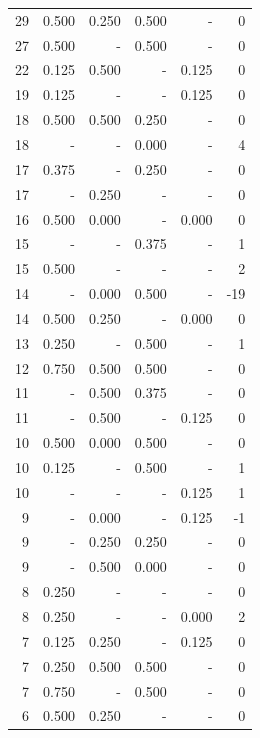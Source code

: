 \documentclass[a4paper]{article}\usepackage[]{graphicx}\usepackage[]{color}
\begin{document}
\begin{table}[ht]
\begin{tabular}{rrrrrr}
   \rowcolor{badColor} 29 & 0.500 & 0.250 & 0.500 & - & 0 \\ 
   \rowcolor{sosoColor} 27 & 0.500 & - & 0.500 & - & 0 \\ 
  22 & 0.125 & 0.500 & - & 0.125 & 0 \\ 
   \rowcolor{nullColor} 19 & 0.125 & - & - & 0.125 & 0 \\ 
   \rowcolor{badColor} 18 & 0.500 & 0.500 & 0.250 & - & 0 \\ 
   \rowcolor{sosoColor} 18 & - & - & 0.000 & - & 4 \\ 
   \rowcolor{sosoColor} 17 & 0.375 & - & 0.250 & - & 0 \\ 
  17 & - & 0.250 & - & - & 0 \\ 
  16 & 0.500 & 0.000 & - & 0.000 & 0 \\ 
   \rowcolor{sosoColor} 15 & - & - & 0.375 & - & 1 \\ 
   \rowcolor{nullColor} 15 & 0.500 & - & - & - & 2 \\ 
   \rowcolor{badColor} 14 & - & 0.000 & 0.500 & - & -19 \\ 
  14 & 0.500 & 0.250 & - & 0.000 & 0 \\ 
   \rowcolor{sosoColor} 13 & 0.250 & - & 0.500 & - & 1 \\ 
   \rowcolor{goodColor} 12 & 0.750 & 0.500 & 0.500 & - & 0 \\ 
  11 & - & 0.500 & 0.375 & - & 0 \\ 
  11 & - & 0.500 & - & 0.125 & 0 \\ 
   \rowcolor{badColor} 10 & 0.500 & 0.000 & 0.500 & - & 0 \\ 
   \rowcolor{sosoColor} 10 & 0.125 & - & 0.500 & - & 1 \\ 
   \rowcolor{nullColor} 10 & - & - & - & 0.125 & 1 \\ 
  9 & - & 0.000 & - & 0.125 & -1 \\ 
   \rowcolor{goodColor} 9 & - & 0.250 & 0.250 & - & 0 \\ 
   \rowcolor{badColor} 9 & - & 0.500 & 0.000 & - & 0 \\ 
   \rowcolor{nullColor} 8 & 0.250 & - & - & - & 0 \\ 
   \rowcolor{nullColor} 8 & 0.250 & - & - & 0.000 & 2 \\ 
  7 & 0.125 & 0.250 & - & 0.125 & 0 \\ 
   \rowcolor{goodColor} 7 & 0.250 & 0.500 & 0.500 & - & 0 \\ 
   \rowcolor{sosoColor} 7 & 0.750 & - & 0.500 & - & 0 \\ 
  6 & 0.500 & 0.250 & - & - & 0 \\ 

\end{tabular}
\end{table}
\end{document}

